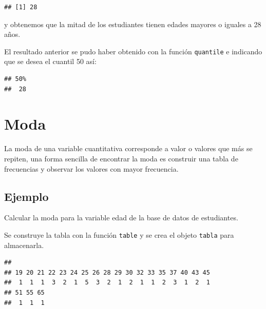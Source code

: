 \documentclass[10pt,]{krantz}
\makeatletter
\newenvironment{Shaded}{\begin{snugshade}}{\end{snugshade}}
\newcommand{\KeywordTok}[1]{\textcolor[rgb]{0.13,0.29,0.53}{\textbf{{#1}}}}
\newcommand{\DataTypeTok}[1]{\textcolor[rgb]{0.13,0.29,0.53}{{#1}}}
\newcommand{\FloatTok}[1]{\textcolor[rgb]{0.00,0.00,0.81}{{#1}}}
\newcommand{\StringTok}[1]{\textcolor[rgb]{0.31,0.60,0.02}{{#1}}}
\newcommand{\NormalTok}[1]{{#1}}
\newenvironment{kframe}{%
\medskip{}
\setlength{\fboxsep}{.8em}
 \def\at@end@of@kframe{}%
 \ifinner\ifhmode%
  \def\at@end@of@kframe{\end{minipage}}%
  \begin{minipage}{\columnwidth}%
 \fi\fi%
 \def\FrameCommand##1{\hskip\@totalleftmargin \hskip-\fboxsep
 \colorbox{shadecolor}{##1}\hskip-\fboxsep
     \hskip-\linewidth \hskip-\@totalleftmargin \hskip\columnwidth}%
 \MakeFramed {\advance\hsize-\width
   \@totalleftmargin\z@ \linewidth\hsize
   \@setminipage}}%
 {\par\unskip\endMakeFramed%
 \at@end@of@kframe}
\renewenvironment{Shaded}{\begin{kframe}}{\end{kframe}}
\makeatother
\begin{document}
\begin{verbatim}
## [1] 28
\end{verbatim}

y obtenemos que la mitad de los estudiantes tienen edades mayores o
iguales a 28 años.

El resultado anterior se pudo haber obtenido con la función
\texttt{quantile} e indicando que se desea el cuantil 50 así:

\begin{Shaded}
\end{Shaded}

\begin{verbatim}
## 50% 
##  28
\end{verbatim}

\section{\texorpdfstring{Moda }{Moda }}\label{moda}

La moda de una variable cuantitativa corresponde a valor o valores que
más se repiten, una forma sencilla de encontrar la moda es construir una
tabla de frecuencias y observar los valores con mayor frecuencia.

\subsection*{Ejemplo}\label{ejemplo-4}


Calcular la moda para la variable edad de la base de datos de
estudiantes.

Se construye la tabla con la función \texttt{table} y se crea el objeto
\texttt{tabla} para almacenarla.

\begin{Shaded}
\end{Shaded}

\begin{verbatim}
## 
## 19 20 21 22 23 24 25 26 28 29 30 32 33 35 37 40 43 45 
##  1  1  1  3  2  1  5  3  2  1  2  1  1  2  3  1  2  1 
## 51 55 65 
##  1  1  1
\end{verbatim}
\end{document}
